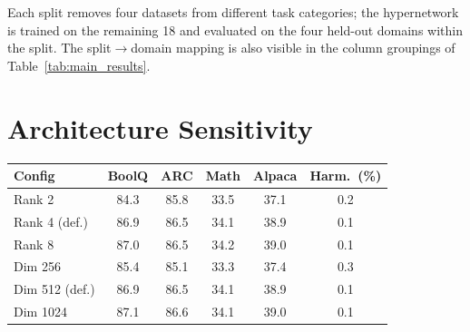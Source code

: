 Each split removes four datasets from different task categories; the hypernetwork is trained on the remaining 18 and evaluated on the four held-out domains within the split. The split$\rightarrow$domain mapping is also visible in the column groupings of Table~\ref{tab:main_results}.

\begin{center}
\begin{minipage}{\linewidth}
\centering
{}
\label{tab:splits}
\renewcommand{\arraystretch}{1.4}
\end{minipage}
\end{center}

\section{Architecture Sensitivity}
\label{app:ablations}

\begin{center}
\begin{minipage}{\linewidth}
\centering
\small
\setlength{\tabcolsep}{5pt}
\renewcommand{\arraystretch}{0.95}
\begin{tabular}{@{}lcccc c@{}}
\toprule
\textbf{Config} & BoolQ & ARC & Math & Alpaca & \textbf{Harm.\ (\%)} \\
\midrule
Rank 2        & 84.3 & 85.8 & 33.5 & 37.1 & 0.2 \\
Rank 4 (def.) & 86.9 & 86.5 & 34.1 & 38.9 & 0.1 \\
Rank 8        & 87.0 & 86.5 & 34.2 & 39.0 & 0.1 \\
\addlinespace
Dim 256       & 85.4 & 85.1 & 33.3 & 37.4 & 0.3 \\
Dim 512 (def.)& 86.9 & 86.5 & 34.1 & 38.9 & 0.1 \\
Dim 1024      & 87.1 & 86.6 & 34.1 & 39.0 & 0.1 \\
\bottomrule
\end{tabular}
\label{tab:ablation_arch}
\end{minipage}
\end{center}

